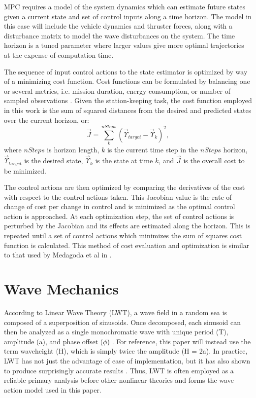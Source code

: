 \documentclass[letterpaper, 10 pt, conferences]{ieeeconf}  %
\begin{document}
MPC requires a model of the system dynamics which can estimate future states given a current state and set of control inputs along a time horizon. The model in this case will include the vehicle dynamics and thruster forces, along with a disturbance matrix to model the wave disturbances on the system. The time horizon is a tuned parameter where larger values give more optimal trajectories at the expense of computation time. 

The sequence of input control actions to the state estimator is optimized by way of a minimizing cost function. Cost functions can be formulated by balancing one or several metrics, i.e. mission duration, energy consumption, or number of sampled observations \cite{lavalle, binney}. Given the station-keeping task, the cost function employed in this work is the sum of squared distances from the desired and predicted states over the current horizon, or:
\begin{equation}
\vec{J} = \sum_{k}^{nSteps}(\vec{\Upsilon}_{target} - \vec{\Upsilon}_k)^2,
\label{eqn1}
\end{equation}
where $nSteps$ is horizon length, $k$ is the current time step in the $nSteps$ horizon, $\vec{\Upsilon}_{target}$ is the desired state, $\vec{\Upsilon}_k$ is the state at time $k$, and $\vec{J}$ is the overall cost to be minimized. 

The control actions are then optimized by comparing the derivatives of the cost with respect to the control actions taken. This Jacobian value is the rate of change of cost per change in control and is minimized as the optimal control action is approached. At each optimization step, the set of control actions is perturbed by the Jacobian and its effects are estimated along the horizon. This is repeated until a set of control actions which minimizes the sum of squares cost function is calculated. This method of cost evaluation and optimization is similar to that used by Medagoda et al in \cite{medagodaMPC}.

\section{Wave Mechanics} 
\label{sec:waves}

According to Linear Wave Theory (LWT), a wave field in a random sea is composed of a superposition of sinusoids. Once decomposed, each sinusoid can then be analyzed as a single monochromatic wave with unique period (T), amplitude (a), and phase offset ($\phi$) \cite{D&D,phillips}. For reference, this paper will instead use the term waveheight (H), which is simply twice the amplitude (H = 2a). In practice, LWT has not just the advantage of ease of implementation, but it has also shown to produce surprisingly accurate results \cite{D&D}. Thus, LWT is often employed as a reliable primary analysis before other nonlinear theories and forms the wave action model used in this paper.
\end{document}
